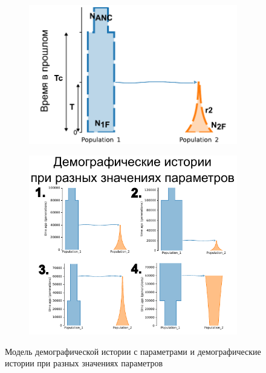 \documentclass[a4paper,14pt,oneside,openany,article]{memoir}
\begin{document}
\begin{figure}[h]
    \centering
    \begin{subfigure}[c]{.5\textwidth}
    \includegraphics[width=\textwidth]{images_2/picture_2pops_model_2_1.pdf}
    \caption{}
    \label{fig:momi:model_1}
    \end{subfigure}%
    \begin{subfigure}[c]{.49\textwidth}
    \includegraphics[width=\textwidth]{images_2/picture_2pops_model_2_2.pdf}
    \caption{}
    \label{fig:momi:model_2}
    \end{subfigure}
    \caption{Модель демографической истории с параметрами и демографические истории при разных значениях параметров}
    \label{fig:momi:model}
\end{figure}
\end{document}
